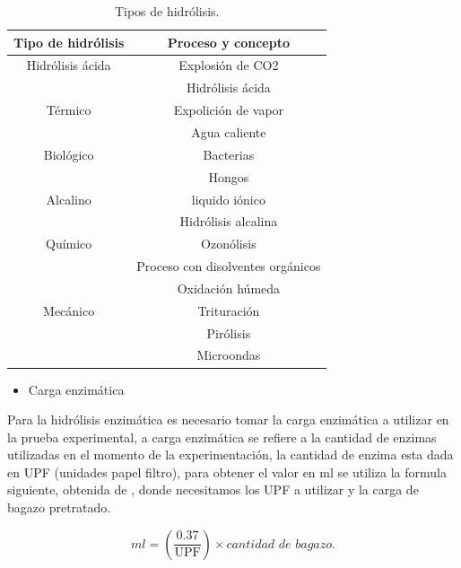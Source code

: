 \documentclass[12pt]{article}
\begin{document}
		\begin{table}[H]
			\centering  
			\caption{Tipos de hidrólisis. }%
			\label{tipos de hidrolisis}
		\begin{tabular}{  | c | c |}
			\hline \textbf{Tipo de hidrólisis} &\textbf{ Proceso y concepto}\\ \hline 
			Hidrólisis ácida   &   Explosión de CO2  \\ 
			
			&   Hidrólisis ácida \\ \hline 
			
			
Térmico			& Expolición de vapor\\
			&  Agua caliente \\ \hline
			Biológico & Bacterias \\
			&  Hongos \\ \hline
			Alcalino  & liquido iónico  \\
			& Hidrólisis alcalina \\ \hline
			Químico   & Ozonólisis\\
			&  Proceso con disolventes orgánicos\\
			& Oxidación húmeda \\ \hline
			Mecánico  & Trituración \\
			&  Pirólisis \\
			&  Microondas \\ \hline
			
		\end{tabular}
		\label{tipos de pretratamientos}
		\end{table}
		
		
		
		\begin{itemize}
		\item  Carga enzimática
		\end{itemize}
		
		Para la hidrólisis enzimática es necesario tomar la carga enzimática a utilizar en la prueba experimental, a carga enzimática se refiere a la cantidad de enzimas utilizadas en el momento de la experimentación, la cantidad de enzima esta dada en UPF (unidades papel filtro),  para obtener el valor en ml se utiliza la formula siguiente, obtenida de \cite{Arturo2022evaluacion}, donde necesitamos los UPF a utilizar y la carga de bagazo pretratado.
		
			\begin{equation}
			 ml = \left( \frac{0.37}{\text{UPF}} \right) \times \textit{cantidad de bagazo} .
			\end{equation}
		
\end{document}
